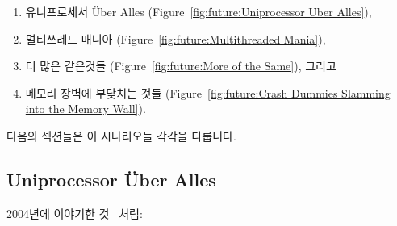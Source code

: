\begin{enumerate}
\item	유니프로세서 \"Uber Alles
	(Figure~\ref{fig:future:Uniprocessor Uber Alles}),
\item	멀티쓰레드 매니아
	(Figure~\ref{fig:future:Multithreaded Mania}),
\item	더 많은 같은것들
	(Figure~\ref{fig:future:More of the Same}), 그리고
\item	메모리 장벽에 부닺치는 것들
	(Figure~\ref{fig:future:Crash Dummies Slamming into the Memory Wall}).

\end{enumerate}

다음의 섹션들은 이 시나리오들 각각을 다룹니다.

\subsection{Uniprocessor \"Uber Alles}
\label{sec:future:Uniprocessor Uber Alles}

2004년에 이야기한 것~\cite{PaulEdwardMcKenneyPhD} 처럼:

